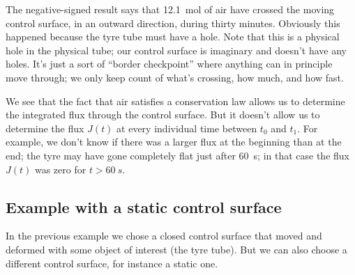 \documentclass[a4paper,12pt,%
onecolumn,oneside,%
british%
]{memoir}
\renewcommand*{\|}[1][]{\nonscript\:#1\vert\nonscript\:\mathopen{}}
\newcommand*{\yti}{t_{0}}
\newcommand*{\ytf}{t_{1}}
\newcommand*{\yJ}{J}
\begin{document}
%
The negative-signed result says that \qty{12.1}{mol} of air have crossed the moving control surface, in an outward direction, during thirty minutes. Obviously this happened because the tyre tube must have a hole.
Note that this is a physical hole in the physical tube; our control surface is imaginary and doesn't have any holes. It's just a sort of \enquote{border checkpoint} where anything can in principle move through; we only keep count of what's crossing, how much, and how fast.

We see that the fact that air satisfies a conservation law allows us to determine the integrated flux through the control surface. But it doesn't allow us to determine the flux $\yJ(t)$ at every individual time between $\yti$ and $\ytf$. For example, we don't know if there was a larger flux at the beginning than at the end; the tyre may have gone completely flat just after \qty{60}{s}; in that case the flux $\yJ(t)$ was zero for $t>\qty{60}{s}$.

\subsection{Example with a static control surface}
\label{sec:example_conservation_static}

In the previous example we chose a closed control surface that moved and deformed with some object of interest (the tyre tube). But we can also choose a different control surface, for instance a static one.
\end{document}
